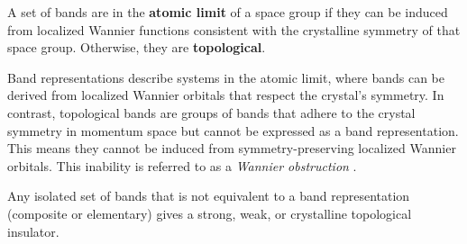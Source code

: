 \begin{definition}
A set of bands are in the \textbf{atomic limit} of a space group if they can be induced from localized Wannier functions consistent with the crystalline symmetry of that space group. Otherwise, they are \textbf{topological}.
\end{definition}

Band representations describe systems in the atomic limit, where bands can be derived from localized Wannier orbitals that respect the crystal's symmetry. In contrast, topological bands are groups of bands that adhere to the crystal symmetry in momentum space but cannot be expressed as a band representation. This means they cannot be induced from symmetry-preserving localized Wannier orbitals. This inability is referred to as a \textit{Wannier obstruction} \cite{FragileTopology_Po2018, building_blocks2018}.

\begin{theorem} \label{th:topo_insul}
Any isolated set of bands that is not equivalent to a band representation (composite or elementary) gives a strong, weak, or crystalline topological insulator.
\end{theorem}


%
%
%


